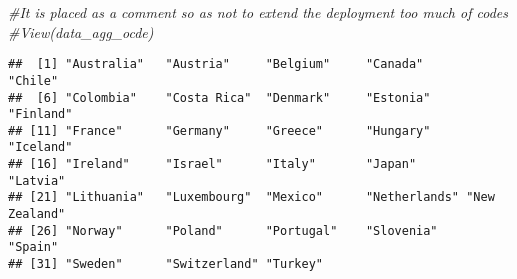 \documentclass[
]{article}
\newenvironment{Shaded}{\begin{snugshade}}{\end{snugshade}}
\newcommand{\CommentTok}[1]{\textcolor[rgb]{0.56,0.35,0.01}{\textit{#1}}}
\newcommand{\DocumentationTok}[1]{\textcolor[rgb]{0.56,0.35,0.01}{\textbf{\textit{#1}}}}
\newcommand{\FunctionTok}[1]{\textcolor[rgb]{0.13,0.29,0.53}{\textbf{#1}}}
\newcommand{\NormalTok}[1]{#1}
\newcommand{\OtherTok}[1]{\textcolor[rgb]{0.56,0.35,0.01}{#1}}
\newcommand{\SpecialCharTok}[1]{\textcolor[rgb]{0.81,0.36,0.00}{\textbf{#1}}}
\newcommand{\StringTok}[1]{\textcolor[rgb]{0.31,0.60,0.02}{#1}}
\begin{document}
\begin{Shaded}
\begin{Highlighting}[]
\CommentTok{\#It is placed as a comment so as not to extend the deployment too much of codes}
\CommentTok{\#View(data\_agg\_ocde)}
\end{Highlighting}
\end{Shaded}

\begin{Shaded}
\end{Shaded}

\begin{verbatim}
##  [1] "Australia"   "Austria"     "Belgium"     "Canada"      "Chile"      
##  [6] "Colombia"    "Costa Rica"  "Denmark"     "Estonia"     "Finland"    
## [11] "France"      "Germany"     "Greece"      "Hungary"     "Iceland"    
## [16] "Ireland"     "Israel"      "Italy"       "Japan"       "Latvia"     
## [21] "Lithuania"   "Luxembourg"  "Mexico"      "Netherlands" "New Zealand"
## [26] "Norway"      "Poland"      "Portugal"    "Slovenia"    "Spain"      
## [31] "Sweden"      "Switzerland" "Turkey"
\end{verbatim}

\begin{Shaded}
\end{Shaded}
\end{document}
